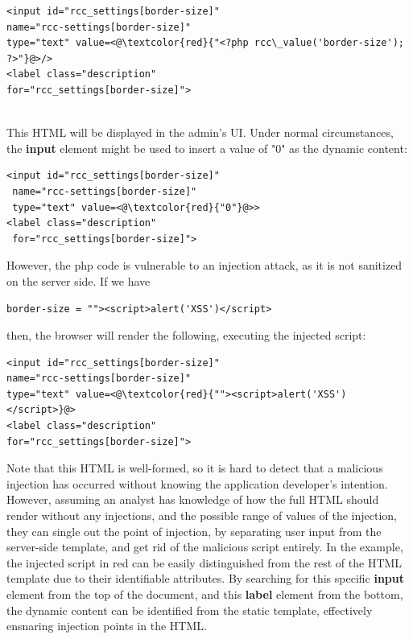 \begin{lstlisting}
<input id="rcc_settings[border-size]" 
name="rcc-settings[border-size]" 
type="text" value=<@\textcolor{red}{"<?php rcc\_value('border-size'); ?>"}@>/>
<label class="description"
for="rcc_settings[border-size]">
\end{lstlisting}
\
\\
This HTML will be displayed in the admin's UI. Under normal circumstances, the \textbf{input} element might be used to insert a value of "0" as the dynamic content:
\\
\begin{lstlisting}
<input id="rcc_settings[border-size]" 
 name="rcc-settings[border-size]" 
 type="text" value=<@\textcolor{red}{"0"}@>>
<label class="description"
 for="rcc_settings[border-size]">
\end{lstlisting}
However, the php code is vulnerable to an injection attack, as it is not sanitized on the server side. If we have
\begin{lstlisting}
border-size = ""><script>alert('XSS')</script>
\end{lstlisting}
then, the browser will render the following, executing the injected script:
\begin{lstlisting}
<input id="rcc_settings[border-size]" 
name="rcc-settings[border-size]" 
type="text" value=<@\textcolor{red}{""><script>alert('XSS')</script>}@>
<label class="description"
for="rcc_settings[border-size]">
\end{lstlisting}

Note that this HTML is well-formed, so it is hard to detect that a malicious injection has occurred without knowing the application developer's intention. However, assuming an analyst has knowledge of how the full HTML should render without any injections, and the possible range of values of the injection, they can single out the point of injection, by separating user input from the server-side template, and get rid of the malicious script entirely. In the example, the injected script in red can be easily distinguished from the rest of the HTML template due to their identifiable attributes. By searching for this specific \textbf{input} element from the top of the document, and this \textbf{label} element from the bottom, the dynamic content can be identified from the static template, effectively ensnaring injection points in the HTML.


